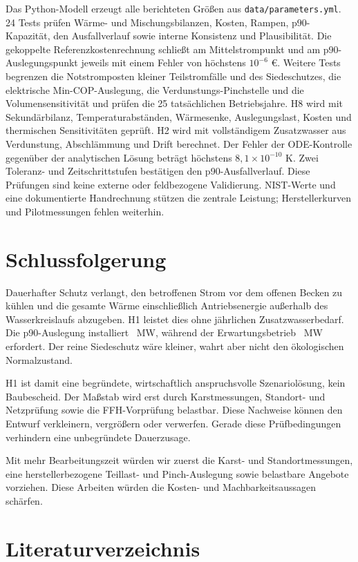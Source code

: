 Das Python-Modell erzeugt alle berichteten Größen aus \texttt{data/parameters.yml}. 24 Tests prüfen Wärme- und Mischungsbilanzen, Kosten, Rampen, p90-Kapazität, den Ausfallverlauf sowie interne Konsistenz und Plausibilität. Die gekoppelte Referenzkostenrechnung schließt am Mittelstrompunkt und am p90-Auslegungspunkt jeweils mit einem Fehler von höchstens \(10^{-6}\) €. Weitere Tests begrenzen die Notstromposten kleiner Teilstromfälle und des Siedeschutzes, die elektrische Min-COP-Auslegung, die Verdunstungs-Pinchstelle und die Volumensensitivität und prüfen die 25 tatsächlichen Betriebsjahre. H8 wird mit Sekundärbilanz, Temperaturabständen, Wärmesenke, Auslegungslast, Kosten und thermischen Sensitivitäten geprüft. H2 wird mit vollständigem Zusatzwasser aus Verdunstung, Abschlämmung und Drift berechnet. Der Fehler der ODE-Kontrolle gegenüber der analytischen Lösung beträgt höchstens \(8,1\times10^{-10}\) K. Zwei Toleranz- und Zeitschrittstufen bestätigen den p90-Ausfallverlauf. Diese Prüfungen sind keine externe oder feldbezogene Validierung. NIST-Werte und eine dokumentierte Handrechnung stützen die zentrale Leistung; Herstellerkurven und Pilotmessungen fehlen weiterhin.

\section{Schlussfolgerung}

Dauerhafter Schutz verlangt, den betroffenen Strom vor dem offenen Becken zu kühlen und die gesamte Wärme einschließlich Antriebsenergie außerhalb des Wasserkreislaufs abzugeben. H1 leistet dies ohne jährlichen Zusatzwasserbedarf. Die p90-Auslegung installiert \QReserve~MW, während der Erwartungsbetrieb \QFinal~MW erfordert. Der reine Siedeschutz wäre kleiner, wahrt aber nicht den ökologischen Normalzustand.

H1 ist damit eine begründete, wirtschaftlich anspruchsvolle Szenariolösung, kein Baubescheid. Der Maßstab wird erst durch Karstmessungen, Standort- und Netzprüfung sowie die FFH-Vorprüfung belastbar. Diese Nachweise können den Entwurf verkleinern, vergrößern oder verwerfen. Gerade diese Prüfbedingungen verhindern eine unbegründete Dauerzusage.

Mit mehr Bearbeitungszeit würden wir zuerst die Karst- und Standortmessungen, eine herstellerbezogene Teillast- und Pinch-Auslegung sowie belastbare Angebote vorziehen. Diese Arbeiten würden die Kosten- und Machbarkeitsaussagen schärfen.

\section*{Literaturverzeichnis}


